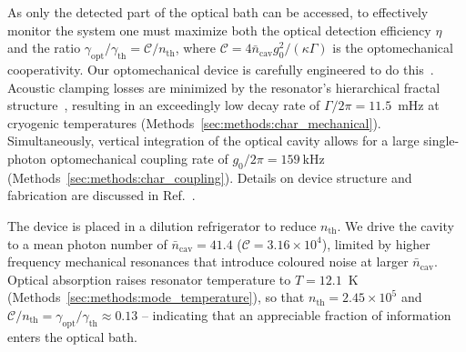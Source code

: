 \documentclass[aps,prx,twocolumn,amsmath,amssymb,superscriptaddress,floatfix,longbibliography
]{revtex4-2}
\begin{document}
As only the detected part of the optical bath can be accessed, to effectively monitor the system one must maximize both the optical detection efficiency $\eta$ and
the ratio $\gamma_\text{opt}/\gamma_\text{th} = \mathcal{C} / n_\text{th}$, where $\mathcal{C} = 4\bar{n}_\text{cav} g_0^2 / (\kappa \Gamma)$ is the optomechanical cooperativity.
Our optomechanical device is carefully engineered to do this~\cite{guo2022integrated,guo2023active}.
Acoustic clamping losses are minimized by the resonator's hierarchical fractal structure~\cite{fedorov2020fractal},
resulting in an exceedingly low decay rate of $\Gamma/2\pi = 11.5$~mHz at cryogenic temperatures (Methods~\ref{sec:methods:char_mechanical}).
Simultaneously, vertical integration of the optical cavity allows for a large single-photon optomechanical coupling rate of $g_0/2\pi = 159~$kHz (Methods~\ref{sec:methods:char_coupling}). 
Details on device structure and fabrication are discussed in Ref.~\cite{guo2022integrated}.

The device is placed in a dilution refrigerator to reduce $n_\text{th}$.
We drive the cavity to a mean photon number of $\bar{n}_\text{cav} = 41.4$ ($\mathcal{C} = 3.16 \times 10^4$), limited by higher frequency mechanical resonances that introduce coloured noise at larger $\bar{n}_\text{cav}$. Optical absorption raises resonator temperature to $T=12.1$~K (Methods~\ref{sec:methods:mode_temperature}), so that $n_\text{th} = 2.45 \times 10^5$ and $\mathcal{C}/n_\text{th} = \gamma_\text{opt}/\gamma_\text{th} \approx 0.13$ -- indicating that an appreciable fraction of information enters the optical bath.
\end{document}
